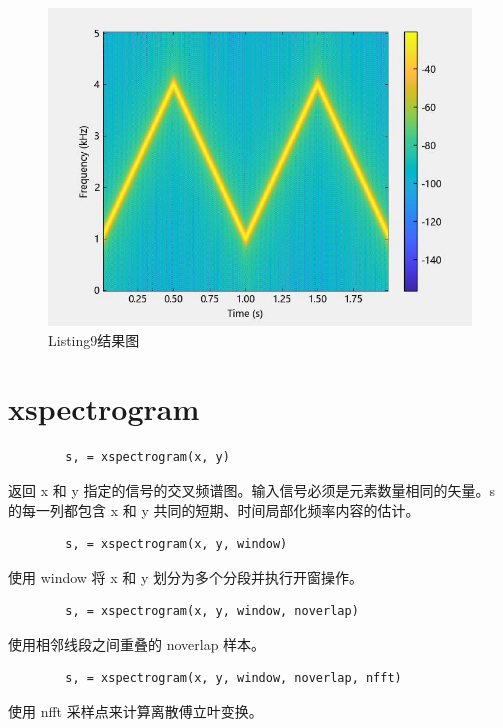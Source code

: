 \documentclass{article}
\begin{document}
	\begin{figure}[htbp]
		\centering
		\includegraphics{hw5(9).jpeg}
		\caption{Listing9结果图}
		\label{fig9}
	\end{figure}
	
	\section*{xspectrogram}
	
	\begin{verbatim}
		s, = xspectrogram(x, y)
	\end{verbatim}
	
	返回 x 和 y 指定的信号的交叉频谱图。输入信号必须是元素数量相同的矢量。s 的每一列都包含 x 和 y 共同的短期、时间局部化频率内容的估计。
	
	\begin{verbatim}
		s, = xspectrogram(x, y, window)
	\end{verbatim}
	
	 使用 window 将 x 和 y 划分为多个分段并执行开窗操作。
	
	\begin{verbatim}
		s, = xspectrogram(x, y, window, noverlap)
	\end{verbatim}
	
	使用相邻线段之间重叠的 noverlap 样本。
	
	\begin{verbatim}
		s, = xspectrogram(x, y, window, noverlap, nfft)
	\end{verbatim}
	
	使用 nfft 采样点来计算离散傅立叶变换。
	
\end{document}
